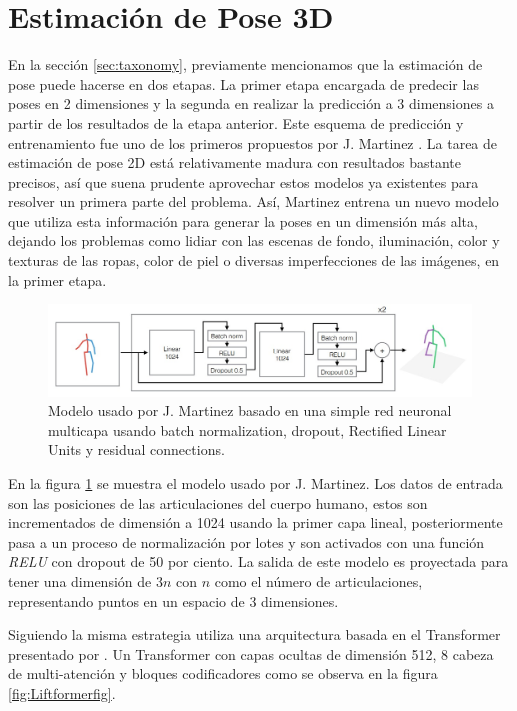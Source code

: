 \section{Estimación de Pose 3D}

En la sección \ref{sec:taxonomy}, previamente mencionamos que la estimación de pose puede hacerse
en dos etapas. La primer etapa encargada de predecir las poses en 2 dimensiones y la segunda en
realizar la predicción a 3 dimensiones a partir de los resultados de la etapa anterior. Este esquema
de predicción y entrenamiento fue uno de los primeros propuestos por J. Martinez
\cite{DBLP:journals/corr/MartinezHRL17}. La tarea de estimación de pose 2D está relativamente madura
con resultados bastante precisos, así que suena prudente aprovechar estos modelos ya existentes para
resolver un primera parte del problema. Así, Martinez entrena un nuevo modelo que utiliza esta
información para generar la poses en un dimensión más alta, dejando los problemas como lidiar con las
escenas de fondo, iluminación, color y texturas de las ropas, color de piel o diversas imperfecciones
de las imágenes, en la primer etapa.

\begin{figure}[!ht]
    \centering
    \includegraphics[width=.9\textwidth]{Chapters/3. Trans-HPE/img/martinez_model.jpeg}
    \caption[2D a 3D model]{Modelo usado por J. Martinez \cite{DBLP:journals/corr/MartinezHRL17}
    basado en una simple red neuronal multicapa usando batch normalization, dropout, Rectified
    Linear Units y residual connections.}
\label{fig:model_martinez}
\end{figure}

En la figura \ref{fig:model_martinez} se muestra el modelo usado por J. Martinez. Los datos de entrada
son las posiciones de las articulaciones del cuerpo humano, estos son incrementados de dimensión a
1024 usando la primer capa lineal, posteriormente pasa a un proceso de normalización por lotes
y son activados con una función \textit{RELU} con dropout de 50 por ciento. La salida de este modelo
es proyectada para tener una dimensión de $3n$ con $n$ como el número de articulaciones, representando
puntos en un espacio de 3 dimensiones.

Siguiendo la misma estrategia \citeauthor{DBLP:journals/corr/abs-2009-00348}
\cite{DBLP:journals/corr/abs-2009-00348} utiliza una arquitectura
basada en el Transformer presentado por \citeauthor{Vaswani} \cite{Vaswani}. Un Transformer con capas
ocultas de dimensión 512, 8 cabeza de multi-atención y bloques codificadores como se observa en la
figura \ref{fig:Liftformerfig}.

